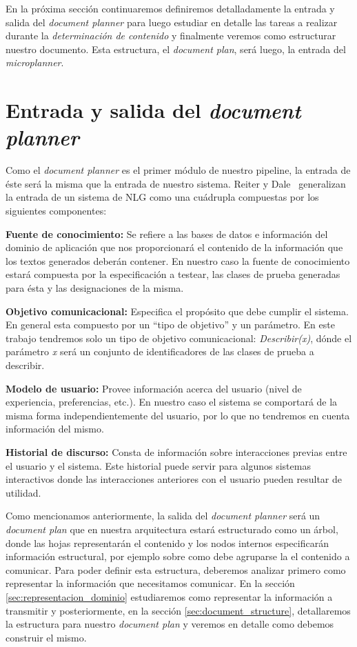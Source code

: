 En la próxima sección continuaremos definiremos detalladamente la entrada y salida del \textit{document planner} para luego estudiar en detalle las tareas a realizar durante la \emph{determinación de contenido} y finalmente veremos como estructurar nuestro documento. Esta estructura, el \emph{document plan}, será luego, la entrada del \emph{microplanner}.

\section{Entrada y salida del \textit{document planner}}
Como el \textit{document planner} es el primer módulo de nuestro pipeline, la entrada de éste será la misma que la entrada de nuestro sistema. Reiter y Dale~\cite{reiter_dale} generalizan la entrada de un sistema de NLG  como una cuádrupla compuestas por los siguientes componentes:

\bigskip
\noindent
\textbf{Fuente de conocimiento:} Se refiere a las bases de datos e información del dominio de aplicación que nos proporcionará el contenido de la información que los textos generados deberán contener.
En nuestro caso la fuente de conocimiento estará compuesta por la especificación a testear, las clases de prueba generadas para ésta y las designaciones de la misma. 

\bigskip
\noindent
\textbf{Objetivo comunicacional:} Especifica el propósito que debe cumplir el sistema. En general esta compuesto por un ``tipo de objetivo'' y un parámetro.
En este trabajo tendremos solo un tipo de objetivo comunicacional: \emph{Describir(x)}, dónde el parámetro \emph{x} será un conjunto de identificadores de las clases de prueba a describir.

\bigskip
\noindent
\textbf{Modelo de usuario:} Provee información acerca del usuario (nivel de experiencia, preferencias, etc.). En nuestro caso el sistema se comportará de la misma forma independientemente del usuario, por lo que no tendremos en cuenta información del mismo.

\bigskip
\noindent
\textbf{Historial de discurso:} Consta de información sobre interacciones previas entre el usuario y el sistema. Este historial puede servir para algunos sistemas interactivos donde las interacciones anteriores con el usuario pueden resultar de utilidad. 

\bigskip
Como mencionamos anteriormente, la salida del \textit{document planner} será un \textit{document plan} que en nuestra arquitectura estará estructurado como un árbol, donde las hojas representarán el contenido y los nodos internos especificarán información estructural, por ejemplo sobre como debe agruparse la el contenido a comunicar. Para poder definir esta estructura, deberemos analizar primero como representar la información que necesitamos comunicar. En la sección \ref{sec:representacion_dominio} estudiaremos como representar la información a transmitir y posteriormente, en la sección \ref{sec:document_structure}, detallaremos la estructura para nuestro \emph{document plan} y veremos en detalle como debemos construir el mismo.

